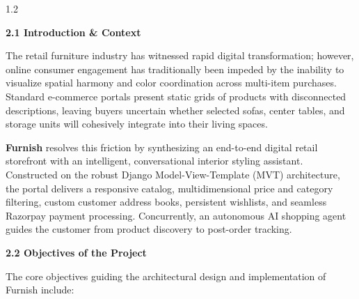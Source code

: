 \documentclass[12pt,a4paper]{article}
\begin{document}
{\fontsize{13.5}{19.5}\selectfont
\begin{spacing}{1.2}

\noindent
\textbf{2.1 Introduction \& Context}

\vspace{0.05in}

\noindent
The retail furniture industry has witnessed rapid digital transformation; however, online consumer engagement has traditionally been impeded by the inability to visualize spatial harmony and color coordination across multi-item purchases. Standard e-commerce portals present static grids of products with disconnected descriptions, leaving buyers uncertain whether selected sofas, center tables, and storage units will cohesively integrate into their living spaces.

\vspace{0.10in}

\noindent
\textbf{Furnish} resolves this friction by synthesizing an end-to-end digital retail storefront with an intelligent, conversational interior styling assistant. Constructed on the robust Django Model-View-Template (MVT) architecture, the portal delivers a responsive catalog, multidimensional price and category filtering, custom customer address books, persistent wishlists, and seamless Razorpay payment processing. Concurrently, an autonomous AI shopping agent guides the customer from product discovery to post-order tracking.

\vspace{0.4in}

\noindent
\textbf{2.2 Objectives of the Project}

\vspace{0.05in}

\noindent
The core objectives guiding the architectural design and implementation of Furnish include:

\vspace{0.08in}


\end{spacing}}
\end{document}
